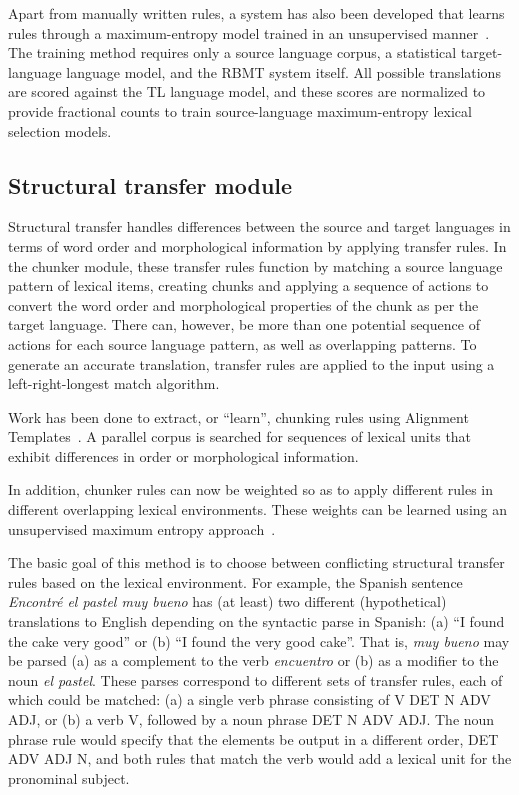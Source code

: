 \documentclass[free]{flammie}
\begin{document}
Apart from manually written rules, a system has also been developed that learns
rules through a maximum-entropy model trained in an unsupervised
manner~\cite{tyers2014unsupervised}.  The training method requires only a source language
corpus, a statistical target-language language model, and the RBMT system
itself.  All possible translations are scored against the TL language model, and
these scores are normalized to provide fractional counts to train
source-language maximum-entropy lexical selection models.

\subsection{Structural transfer module}\label{sec:StructuralTr}

Structural transfer handles differences between the source and target languages
in terms of word order and morphological information by applying transfer rules.
In the chunker module, these transfer rules function by matching a source
language pattern of lexical items, creating chunks and applying a sequence of
actions to convert the word order and morphological properties of the chunk as
per the target language. There can, however, be more than one potential sequence
of actions for each source language pattern, as well as overlapping patterns. To
generate an accurate translation, transfer rules are applied to the input using
a left-right-longest match algorithm.

Work has been done to extract, or ``learn'', chunking rules using Alignment
Templates~\cite{hutchison2006using,sanchez2007automatic,
martinez2008using,sanchez2009inferring, sanchez-cartagena2015generalised}.  A
parallel corpus is searched for sequences of lexical units that exhibit
differences in order or morphological information.

In addition, chunker rules can now be weighted so as to apply different rules in
different overlapping lexical environments. These weights can be learned using
an unsupervised maximum entropy approach~\cite{bayatli2019unsupervised}.

The basic goal of this method is to choose between conflicting structural
transfer rules based on the lexical environment.  For example, the Spanish
sentence \emph{Encontré el pastel muy bueno} has (at least) two different
(hypothetical) translations to English depending on the syntactic parse in
Spanish: (a) ``I found the cake very good'' or (b) ``I found the very good
cake''.  That is, \emph{muy bueno} may be parsed (a) as a complement to the verb
\emph{encuentro} or (b) as a modifier to the noun \emph{el pastel}.  These
parses correspond to different sets of transfer rules, each of which could be
matched: (a) a single verb phrase consisting of V DET N ADV ADJ, or (b) a verb
V, followed by a noun phrase DET N ADV ADJ.  The noun phrase rule would specify
that the elements be output in a different order, DET ADV ADJ N, and both rules
that match the verb would add a lexical unit for the pronominal subject.
\end{document}
